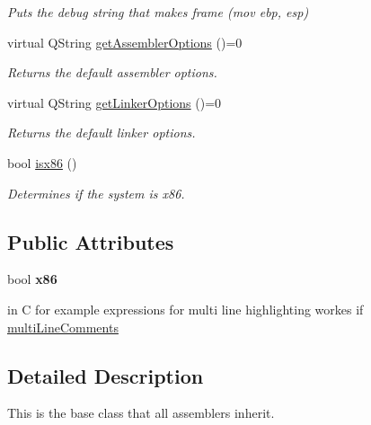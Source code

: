 \begin{DoxyCompactItemize}
\begin{DoxyCompactList}\small\item\em Puts the debug string that makes frame (mov ebp, esp) \end{DoxyCompactList}\item 
\hypertarget{class_assembler_a7f4e8432d28694c2d89db13858ad1329}{}virtual Q\+String \hyperlink{class_assembler_a7f4e8432d28694c2d89db13858ad1329}{get\+Assembler\+Options} ()=0\label{class_assembler_a7f4e8432d28694c2d89db13858ad1329}

\begin{DoxyCompactList}\small\item\em Returns the default assembler options. \end{DoxyCompactList}\item 
\hypertarget{class_assembler_a644bcd38cf0b157d38c608043b63a6b8}{}virtual Q\+String \hyperlink{class_assembler_a644bcd38cf0b157d38c608043b63a6b8}{get\+Linker\+Options} ()=0\label{class_assembler_a644bcd38cf0b157d38c608043b63a6b8}

\begin{DoxyCompactList}\small\item\em Returns the default linker options. \end{DoxyCompactList}\item 
bool \hyperlink{class_assembler_aec6f08e8dd6ff49dfa9118be43ffc8e2}{isx86} ()
\begin{DoxyCompactList}\small\item\em Determines if the system is x86. \end{DoxyCompactList}\end{DoxyCompactItemize}
\subsection*{Public Attributes}
\begin{DoxyCompactItemize}
\item 
\hypertarget{class_assembler_a0a5d86a7ad035ed7113c4424c43d11fc}{}bool {\bfseries x86}\label{class_assembler_a0a5d86a7ad035ed7113c4424c43d11fc}

\item 
in C for example expressions for multi line highlighting workes if \hyperlink{class_assembler_a8e2ae531c6d59dfea8c7bb90febda262}{multi\+Line\+Comments}
\end{DoxyCompactItemize}


\subsection{Detailed Description}
This is the base class that all assemblers inherit. 

